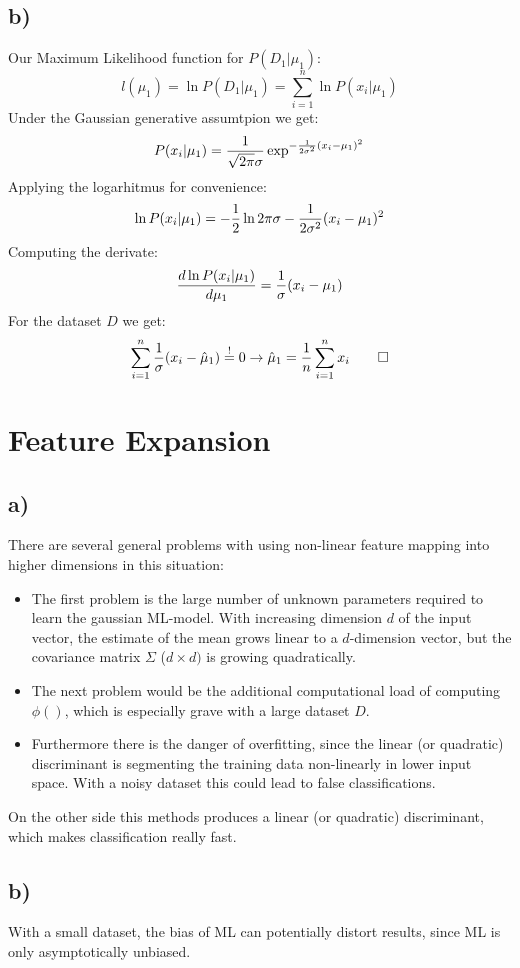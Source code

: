 \documentclass[paper=a4,fontsize=10pt,DIV11,BCOR10mm]{scrartcl}
\begin{document}
\subsection*{b)}
	Our Maximum Likelihood function for $P(D_1|\mu_1)$:
	\[
	l(\mu_1) = \ln P(D_1|\mu_1) = \sum_{i=1}^n \ln P(x_i|\mu_1)
	\]
	Under the Gaussian generative assumtpion we get:
	\[
		P(x_i|\mu_1) = \frac{1}{\sqrt{2\pi}\sigma}\exp^{-\frac{1}{2\sigma^2}(x_i-\mu_1)^2}\\
	\]
	Applying the logarhitmus for convenience:
	\[
		\ln P(x_i|\mu_1) =-\frac{1}{2} \ln 2\pi \sigma -\frac{1}{2\sigma^2}(x_i-\mu_1)^2\\
	\]
	Computing the derivate:
	\[	
		\frac{d \ln P(x_i|\mu_1)}{d \mu_1} = \frac{1}{\sigma}(x_i- \mu_1)\\
	\]
	For the dataset $D$ we get:
	\[
		\sum_{i=1}^n \frac{1}{\sigma}(x_i- \hat{\mu}_1) \stackrel{!}{=} 0\\
	\rightarrow \hat{\mu}_1=\frac{1}{n} \sum_{i=1}^n x_i \qed
	\]
\section{Feature Expansion}
	\subsection*{a)} There are several general problems with using non-linear feature mapping into higher dimensions in this situation:
	\begin{itemize}
	\item The first problem is the large number of unknown parameters required to learn the gaussian ML-model. With increasing dimension $d$ of the input vector, the estimate of the mean grows linear to a $d$-dimension vector, but the covariance matrix $\Sigma$ ($d \times d)$ is growing quadratically.
	\item The next problem would be the additional computational load of computing $\phi()$, which is especially grave with a large dataset $D$.
	\item Furthermore there is the danger of overfitting, since the linear (or quadratic) discriminant is segmenting the training data non-linearly in lower input space. With a noisy dataset this could lead to false classifications.
	\end{itemize}
	On the other side this methods produces a linear (or quadratic) discriminant, which makes classification really fast.
	
	\subsection*{b)}
	With a small dataset, the bias of ML can potentially distort results, since ML is only asymptotically unbiased.
	






\end{document}
